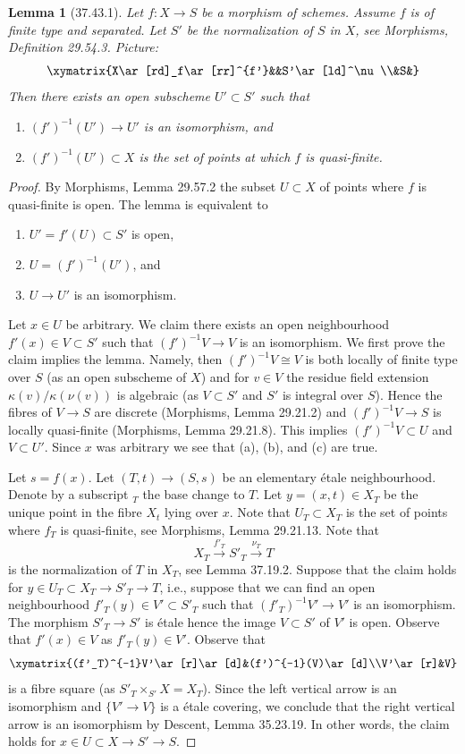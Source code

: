 \documentclass[UTF8,11pt]{ctexart}
\newtheorem*{lemma}{Lemma}
\theoremstyle{definition}
\begin{document}
\begin{lemma}[37.43.1]
Let $f:X\to S$ be a morphism of schemes. Assume $f$ is of finite type and separated. Let $S'$ be the normalization of $S$ in $X$, see Morphisms, Definition 29.54.3. Picture:
\[
\xymatrix{X\ar[rd]_f\ar[rr]^{f'}&&S'\ar[ld]^\nu\\&S&}
\]
Then there exists an open subscheme $U'\subset S'$ such that
\begin{enumerate}
\item $(f')^{-1}(U')\to U'$ is an isomorphism, and
\item $(f')^{-1}(U')\subset X$ is the set of points at which $f$ is quasi-finite.
\end{enumerate}
\end{lemma}
\begin{proof}
By Morphisms, Lemma 29.57.2 the subset $U\subset X$ of points where $f$ is quasi-finite is open. The lemma is equivalent to
\begin{enumerate}[label=(\alph*)]
\item $U'=f'(U)\subset S'$ is open,
\item $U=(f')^{-1}(U')$, and
\item $U\to U'$ is an isomorphism.
\end{enumerate}
Let $x\in U$ be arbitrary. We claim there exists an open neighbourhood $f'(x)\in V\subset S'$ such that $(f')^{-1}V\to V$ is an isomorphism. We first prove the claim implies the lemma. Namely, then $(f')^{-1}V\cong V$ is both locally of finite type over $S$ (as an open subscheme of $X$) and for $v\in V$ the residue field extension $\kappa(v)/\kappa(\nu(v))$ is algebraic (as $V\subset S'$ and $S'$ is integral over $S$). Hence the fibres of $V\to S$ are discrete (Morphisms, Lemma 29.21.2) and $(f')^{-1}V\to S$ is locally quasi-finite (Morphisms, Lemma 29.21.8). This implies $(f')^{-1}V\subset U$ and $V\subset U'$. Since $x$ was arbitrary we see that (a), (b), and (c) are true.

Let $s=f(x)$. Let $(T,t)\to(S,s)$ be an elementary étale neighbourhood. Denote by a subscript ${}_T$ the base change to $T$. Let $y=(x,t)\in X_T$ be the unique point in the fibre $X_t$ lying over $x$. Note that $U_T\subset X_T$ is the set of points where $f_T$ is quasi-finite, see Morphisms, Lemma 29.21.13. Note that
\[
X_T\xrightarrow{f'_T}S'_T\xrightarrow{\nu_T}T
\]
is the normalization of $T$ in $X_T$, see Lemma 37.19.2. Suppose that the claim holds for $y\in U_T\subset X_T\to S'_T\to T$, i.e., suppose that we can find an open neighbourhood $f'_T(y)\in V'\subset S'_T$ such that $(f'_T)^{-1}V'\to V'$ is an isomorphism. The morphism $S'_T\to S'$ is étale hence the image $V\subset S'$ of $V'$ is open. Observe that $f'(x)\in V$ as $f'_T(y)\in V'$. Observe that
\[
\xymatrix{(f'_T)^{-1}V'\ar[r]\ar[d]&(f')^{-1}(V)\ar[d]\\V'\ar[r]&V}
\]
is a fibre square (as $S'_T\times_{S'}X=X_T$). Since the left vertical arrow is an isomorphism and $\{V'\to V\}$ is a étale covering, we conclude that the right vertical arrow is an isomorphism by Descent, Lemma 35.23.19. In other words, the claim holds for $x\in U\subset X\to S'\to S$.


\end{proof}
\end{document}
